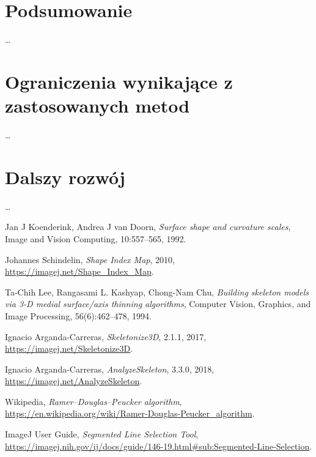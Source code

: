\documentclass[declaration,shortabstract,mgr]{iithesis}
\begin{document}
\section{Podsumowanie}
\ldots %
\section{Ograniczenia wynikające z zastosowanych metod}
\ldots %
\section{Dalszy rozwój}
\ldots %







\begin{thebibliography}{1}

  Jan J Koenderink, Andrea J van Doorn,
  \emph{Surface shape and curvature scales},
  Image and Vision Computing,
  10:557--565,
  1992.

  Johannes Schindelin,
  \emph{Shape Index Map},
  2010,
  \url{https://imagej.net/Shape_Index_Map}.

  Ta-Chih Lee, Rangasami L. Kashyap, Chong-Nam Chu,
  \emph{Building skeleton models via 3-D medial surface/axis thinning algorithms},
  Computer Vision, Graphics, and Image Processing,
  56(6):462--478,
  1994.

  Ignacio Arganda-Carreras,
  \emph{Skeletonize3D},
  2.1.1,
  2017,
  \url{https://imagej.net/Skeletonize3D}.

  Ignacio Arganda-Carreras,
  \emph{AnalyzeSkeleton},
  3.3.0,
  2018,
  \url{https://imagej.net/AnalyzeSkeleton}.
  
  Wikipedia,
  \emph{Ramer--Douglas--Peucker algorithm},
  \url{https://en.wikipedia.org/wiki/Ramer-Douglas-Peucker_algorithm}.
  
  ImageJ User Guide,
  \emph{Segmented Line Selection Tool},
  \url{https://imagej.nih.gov/ij/docs/guide/146-19.html#sub:Segmented-Line-Selection}.

\end{thebibliography}
\end{document}
